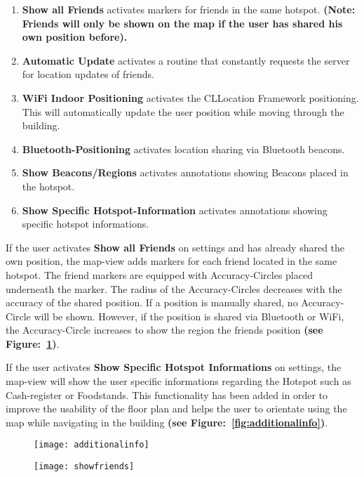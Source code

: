 \begin{enumerate}
\item \textbf{Show all Friends} activates markers for friends in the same hotspot. \textbf{(Note: Friends will only be shown on the map if the user has shared his own position before).}
\item \textbf{Automatic Update} activates a routine that constantly requests the server for location updates of friends.
\item \textbf{WiFi Indoor Positioning} activates the CLLocation Framework positioning. This will automatically update the user position while moving through the building.
\item \textbf{Bluetooth-Positioning} activates location sharing via Bluetooth beacons.
\item \textbf{Show Beacons/Regions} activates annotations showing Beacons placed in the hotspot.
\item \textbf{Show Specific Hotspot-Information} activates annotations showing specific hotspot informations.
\end{enumerate}

If the user activates \textbf{Show all Friends} on settings and has already shared the own position, the map-view adds markers for each friend located in the same hotspot. The friend markers are equipped with Accuracy-Circles placed underneath the marker. The radius of the Accuracy-Circles decreases with the accuracy of the shared position. If a position is manually shared, no Accuracy-Circle will be shown. However, if the position is shared via Bluetooth or WiFi, the Accuracy-Circle increases to show the region the friends position \textbf{(see Figure:~\ref{fig:showfriends})}.

If the user activates \textbf{Show Specific Hotspot Informations} on settings, the map-view will show the user specific informations regarding the Hotspot such as Cash-register or Foodstands. This functionality has been added in order to improve the usability of the floor plan and helps the user to orientate using the map while navigating in the building \textbf{(see Figure:~\ref{fig:additionalinfo})}.

\begin{figure}
\centering
\begin{minipage}{.5\textwidth}
  \centering
  \texttt{[image: additionalinfo]}
  \label{fig:additionalinfo}
\end{minipage}%
\begin{minipage}{.5\textwidth}
  \centering
  \texttt{[image: showfriends]}
  \label{fig:showfriends}
\end{minipage}
\end{figure}


